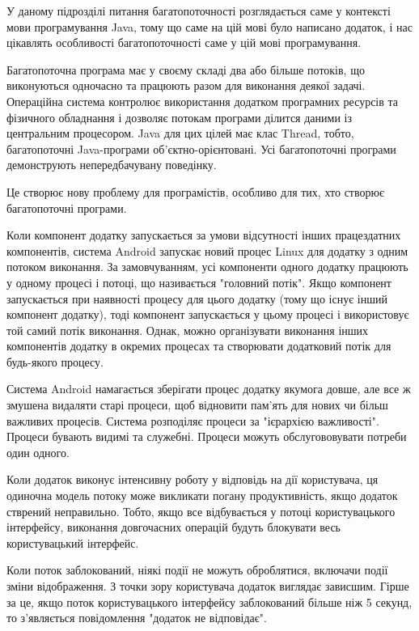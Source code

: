 У даному підрозділі питання багатопоточності розглядається саме у контексті мови програмування Java, тому що саме на цій мові було написано додаток, і нас цікавлять особливості багатопоточності саме у цій мові програмування.

Багатопоточна програма має у своєму складі два або більше потоків, що виконуються одночасно та працюють разом для виконання деякої задачі. Операційна система контролює використання додатком програмних ресурсів та фізичного обладнання і дозволяє потокам програми ділится даними із центральним процесором. Java для цих цілей має клас Thread, тобто, багатопоточні Java-програми об'єктно-орієнтовані. Усі багатопоточні програми демонструють непередбачувану поведінку.

Це створює нову проблему для програмістів, особливо для тих, хто створює багатопоточні програми. \cite{carver2005modern}

Коли компонент додатку запускається за умови відсутності інших працездатних компонентів, система Android запускає новий процес Linux для додатку з одним потоком виконання. За замовчуванням, усі компоненти одного додатку працюють у одному процесі і потоці, що називається "головний потік". Якщо компонент запускається при наявності процесу для цього додатку (тому що існує інший компонент додатку), тоді компонент запускається у цьому процесі і використовує той самий потік виконання. Однак, можно організувати виконання інших компонентів додатку в окремих процесах та створювати додатковий потік для будь-якого процесу.

Система Android намагається зберігати процес додатку якумога довше, але все ж змушена видаляти старі процеси, щоб відновити пам'ять для нових чи більш важливих процесів. Система розподіляє процеси за "ієрархією важливості". Процеси бувають видимі та служебні. Процеси можуть обслугововувати потреби один одного.

Коли додаток виконує інтенсивну роботу у відповідь на дії користувача, ця одиночна модель потоку може викликати погану продуктивність, якщо додаток стврений неправильно. Тобто, якщо все відбувається у потоці користувацького інтерфейсу, виконання довгочасних операцій будуть блокувати весь користувацький інтерфейс.

Коли поток заблокований, ніякі події не можуть оброблятися, включачи події зміни відображення. З точки зору користувача додаток виглядає зависшим. Гірше за це, якщо поток користувацького інтерфейсу заблокований більше ніж 5 секунд, то з'являється повідомлення "додаток не відповідає".

